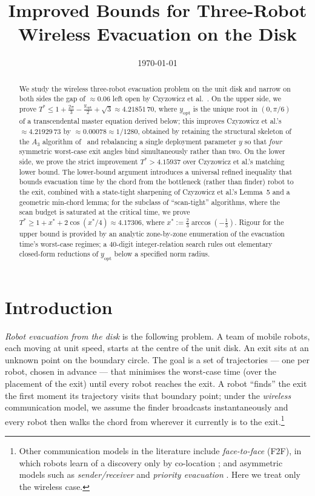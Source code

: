 \documentclass[11pt]{article}
\title{Improved Bounds for Three-Robot Wireless Evacuation on the Disk}
\author{}
\date{\today}
\theoremstyle{plain}
\theoremstyle{definition}
\theoremstyle{remark}
\begin{document}
\maketitle

\begin{abstract}
We study the wireless three-robot evacuation problem on the unit disk
and narrow on both sides the gap of $\approx 0.06$ left open by
Czyzowicz et al.~\cite{czyzowicz2014}. On the upper side, we prove
$T^* \le 1 + \tfrac{2\pi}{3} - \tfrac{y_{\mathrm{opt}}}{2} + \sqrt 3
\approx 4.21851\,70$, where $y_{\mathrm{opt}}$ is the unique root in
$(0, \pi/6)$ of a transcendental master equation derived below; this
improves Czyzowicz et al.'s $\approx 4.21929\,73$ by $\approx 0.00078
\approx 1/1280$, obtained by retaining the structural skeleton of the
$A_3$ algorithm of~\cite{czyzowicz2014} and rebalancing a single
deployment parameter $y$ so that \emph{four} symmetric worst-case exit
angles bind simultaneously rather than two. On the lower side, we prove
the strict improvement $T^* > 4.15937$ over Czyzowicz et al.'s matching
lower bound. The lower-bound argument introduces a universal refined
inequality that bounds evacuation time by the chord from the
bottleneck (rather than finder) robot to the exit, combined with a
state-tight sharpening of Czyzowicz et al.'s Lemma~5 and a geometric
min-chord lemma; for the subclass of ``scan-tight'' algorithms,
where the scan budget is saturated at the critical time, we prove
$T^* \ge 1 + x^* + 2\cos(x^*/4) \approx 4.17306$, where $x^* :=
\tfrac{2}{3}\arccos(-\tfrac{1}{3})$. Rigour for the upper bound is
provided by an analytic zone-by-zone enumeration of the evacuation
time's worst-case regimes; a $40$-digit integer-relation search rules
out elementary closed-form reductions of $y_{\mathrm{opt}}$ below a
specified norm radius.
\end{abstract}

\section{Introduction}
\label{sec:problem}

\emph{Robot evacuation from the disk} is the following problem. A
team of mobile robots, each moving at unit speed, starts at the centre of
the unit disk. An exit sits at an unknown point on the boundary circle.
The goal is a set of trajectories --- one per robot, chosen in advance ---
that minimises the worst-case time (over the placement of the exit)
until every robot reaches the exit. A robot ``finds'' the exit the first
moment its trajectory visits that boundary point; under the \emph{wireless}
communication model, we assume the finder broadcasts
instantaneously and every robot then walks the chord from wherever it
currently is to the exit.\footnote{Other communication models in the
literature include \emph{face-to-face} (F2F), in which robots learn of a
discovery only by co-location \cite{brandt2020}; and asymmetric models such
as \emph{sender/receiver} \cite{georgiou2022} and \emph{priority
evacuation} \cite{czyzowicz2018priority}. Here we treat only the wireless
case.}
\end{document}
